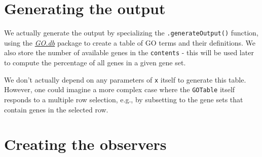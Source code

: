 \documentclass[
]{book}
\newenvironment{Shaded}{\begin{snugshade}}{\end{snugshade}}
\newcommand{\ControlFlowTok}[1]{\textcolor[rgb]{0.13,0.29,0.53}{\textbf{#1}}}
\newcommand{\DataTypeTok}[1]{\textcolor[rgb]{0.13,0.29,0.53}{#1}}
\newcommand{\KeywordTok}[1]{\textcolor[rgb]{0.13,0.29,0.53}{\textbf{#1}}}
\newcommand{\NormalTok}[1]{#1}
\newcommand{\OperatorTok}[1]{\textcolor[rgb]{0.81,0.36,0.00}{\textbf{#1}}}
\newcommand{\StringTok}[1]{\textcolor[rgb]{0.31,0.60,0.02}{#1}}
\begin{document}
\hypertarget{generating-the-output}{%
\section{Generating the output}\label{generating-the-output}}

We actually generate the output by specializing the \texttt{.generateOutput()} function,
using the \emph{\href{https://bioconductor.org/packages/3.11/GO.db}{GO.db}} package to create a table of GO terms and their definitions.
We also store the number of available genes in the \texttt{contents} -
this will be used later to compute the percentage of all genes in a given gene set.

\begin{Shaded}
\end{Shaded}

We don't actually depend on any parameters of \texttt{x} itself to generate this table.
However, one could imagine a more complex case where the \texttt{GOTable} itself responds to a multiple row selection,
e.g., by subsetting to the gene sets that contain genes in the selected row.

\hypertarget{creating-the-observers}{%
\section{Creating the observers}\label{creating-the-observers}}
\end{document}
